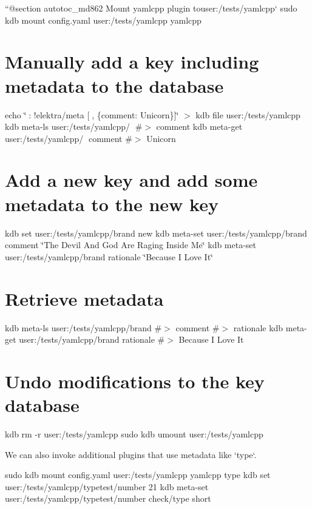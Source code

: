 ``{\ttfamily  @section autotoc\+\_\+md862 Mount yamlcpp plugin to}user\+:/tests/yamlcpp` sudo kdb mount config.\+yaml user\+:/tests/yamlcpp yamlcpp\hypertarget{autotoc_md817_autotoc_md863}{}\section{Manually add a key including metadata to the database}\label{autotoc_md817_autotoc_md863}
echo \char`\"{}🔑\+: !elektra/meta \mbox{[}🦄, \{comment\+: Unicorn\}\mbox{]}\char`\"{} $>$ {\ttfamily kdb file user\+:/tests/yamlcpp} kdb meta-\/ls user\+:/tests/yamlcpp/🔑 \#$>$ comment kdb meta-\/get user\+:/tests/yamlcpp/🔑 comment \#$>$ Unicorn\hypertarget{autotoc_md817_autotoc_md864}{}\section{Add a new key and add some metadata to the new key}\label{autotoc_md817_autotoc_md864}
kdb set user\+:/tests/yamlcpp/brand new kdb meta-\/set user\+:/tests/yamlcpp/brand comment \char`\"{}\+The Devil And God Are Raging Inside Me\char`\"{} kdb meta-\/set user\+:/tests/yamlcpp/brand rationale \char`\"{}\+Because I Love It\char`\"{}\hypertarget{autotoc_md817_autotoc_md865}{}\section{Retrieve metadata}\label{autotoc_md817_autotoc_md865}
kdb meta-\/ls user\+:/tests/yamlcpp/brand \#$>$ comment \#$>$ rationale kdb meta-\/get user\+:/tests/yamlcpp/brand rationale \#$>$ Because I Love It\hypertarget{autotoc_md817_autotoc_md866}{}\section{Undo modifications to the key database}\label{autotoc_md817_autotoc_md866}
kdb rm -\/r user\+:/tests/yamlcpp sudo kdb umount user\+:/tests/yamlcpp 
\begin{DoxyCode}
We can also invoke additional plugins that use metadata like `type`.
\end{DoxyCode}
 sudo kdb mount config.\+yaml user\+:/tests/yamlcpp yamlcpp type kdb set user\+:/tests/yamlcpp/typetest/number 21 kdb meta-\/set user\+:/tests/yamlcpp/typetest/number check/type short

